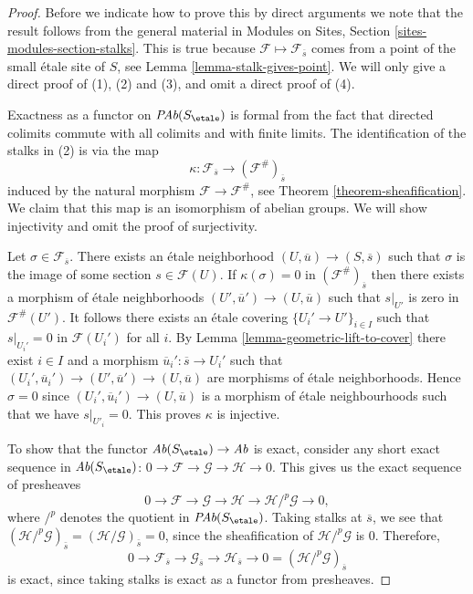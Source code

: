 \begin{proof}
Before we indicate how to prove this by direct arguments
we note that the result follows from the general material in
Modules on Sites, Section \ref{sites-modules-section-stalks}.
This is true because $\mathcal{F} \mapsto \mathcal{F}_{\overline{s}}$
comes from a point of the small \'etale site of $S$, see
Lemma \ref{lemma-stalk-gives-point}.
We will only give a direct proof of (1), (2) and (3), and omit
a direct proof of (4).

\medskip\noindent
Exactness as a functor on $\textit{PAb}(S_\etale)$ is formal from the
fact that directed colimits commute with all colimits and with finite
limits. The identification of the stalks in (2) is via the map
$$
\kappa :
\mathcal{F}_{\overline{s}}
\longrightarrow
(\mathcal{F}^\#)_{\overline{s}}
$$
induced by the natural morphism $\mathcal{F}\to \mathcal{F}^\#$, see
Theorem \ref{theorem-sheafification}.
We claim that this map is an isomorphism of abelian groups. We will show
injectivity and omit the proof of surjectivity.

\medskip\noindent
Let $\sigma\in \mathcal{F}_{\overline{s}}$.
There exists an \'etale neighborhood
$(U, \overline{u})\to (S, \overline{s})$ such that $\sigma$ is the image of some
section $s \in \mathcal{F}(U)$. If $\kappa(\sigma) = 0$ in
$(\mathcal{F}^\#)_{\overline{s}}$ then there exists a morphism of \'etale
neighborhoods $(U', \overline{u}')\to (U, \overline{u})$ such that
$s|_{U'}$ is zero in $\mathcal{F}^\#(U')$. It follows there
exists an \'etale covering
$\{U_i'\to U'\}_{i\in I}$ such that $s|_{U_i'}=0$ in
$\mathcal{F}(U_i')$ for all $i$. By Lemma \ref{lemma-geometric-lift-to-cover}
there exist $i \in I$ and a morphism
$\overline{u}_i': \overline{s} \to U_i'$ such that
$(U_i', \overline{u}_i') \to (U', \overline{u}')\to (U, \overline{u})$
are morphisms of \'etale neighborhoods. Hence $\sigma = 0$
since $(U_i', \overline{u}_i') \to (U, \overline{u})$
is a morphism of \'etale neighbourhoods such that
we have $s|_{U'_i}=0$. This proves $\kappa$ is injective.

\medskip\noindent
To show that the functor $\textit{Ab}(S_\etale) \to \textit{Ab}$ is
exact, consider any short exact sequence in $\textit{Ab}(S_\etale)$:
$
0\to \mathcal{F}\to \mathcal{G}\to \mathcal H \to 0.
$
This gives us the exact sequence of presheaves
$$
0 \to \mathcal{F} \to \mathcal{G} \to \mathcal H \to
\mathcal H/^p\mathcal{G} \to 0,
$$
where $/^p$ denotes the quotient in $\textit{PAb}(S_\etale)$.
Taking stalks at
$\overline{s}$, we see that $(\mathcal H /^p\mathcal{G})_{\bar{s}} =
(\mathcal H /\mathcal{G})_{\bar{s}} = 0$, since the sheafification of
$\mathcal H/^p\mathcal{G}$ is $0$.
Therefore,
$$
0\to \mathcal{F}_{\overline{s}	} \to \mathcal{G}_{\overline{s}} \to
\mathcal{H}_{\overline{s}} \to 0 = (\mathcal H/^p\mathcal{G})_{\overline{s}}
$$
is exact, since taking stalks is exact as a functor from presheaves.
\end{proof}

